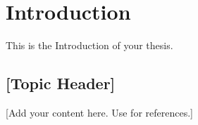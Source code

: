 \chapter{Introduction}
\label{chap:introduction}

This is the Introduction of your thesis.

\section{[Topic Header]}
[Add your content here. Use \cite{sample} for references.]
